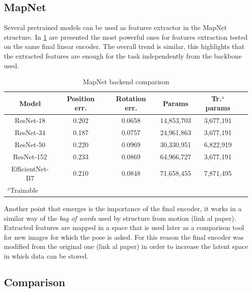\subsection{MapNet}
Several pretrained models can be used as features extractor in the MapNet structure. In \cref{tab:mapnet-backends} are presented the most powerful ones for features extraction tested on the same final linear encoder. The overall trend is similar, this highlights that the extracted features are enough for the task independently from the backbone used.
\begin{table}[htbp]
\caption{MapNet backend comparison}
\begin{center}
\begin{tabular}{|c|c|c|c|c|c|}
\hline
\textbf{Model}&\textbf{Position err.}&\textbf{Rotation err.}&\textbf{Params}&\textbf{Tr.$^{\mathrm{a}}$ params} \\
\hline
ResNet-18       &0.202&0.0658&14,853,703&3,677,191 \\
ResNet-34       &0.187&0.0757&24,961,863&3,677,191 \\
ResNet-50       &0.220&0.0969&30,330,951&6,822,919 \\
ResNet-152      &0.233&0.0869&64,966,727&3,677,191 \\
EfficientNet-B7 &0.210&0.0848&71,658,455&7,871,495 \\
\hline
\multicolumn{4}{l}{$^{\mathrm{a}}$Trainable}
\end{tabular}
\label{tab:mapnet-backends}
\end{center}
\end{table}

Another point that emerges is the importance of the final encoder, it works in a similar way of the \textit{bag of words} used by structure from motion (link al paper). Extracted features are mapped in a space that is used later as a comparison tool for new images for which the pose is asked.
For this reason the final encoder was modified from the original one (link al paper) in order to increase the latent space in which data can be stored.

\subsection{Comparison}
